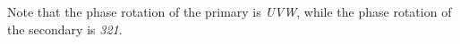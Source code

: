 Note that the phase rotation of the primary is {\it UVW}, while the phase rotation of the secondary is {\it 321}.




